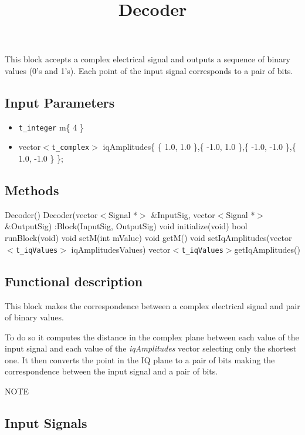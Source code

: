 \documentclass[a4paper]{article}
\title{Decoder}
\begin{document}
\maketitle

This block accepts a complex electrical signal and outputs a sequence of binary values (0's and 1's). Each point of the input signal corresponds to a pair of bits.

\subsection*{Input Parameters}

\begin{itemize}
	\item\texttt{t\_integer} m\{ 4 \}
	\item vector$<$\texttt{t\_complex}$>$ iqAmplitudes\{ \{ 1.0, 1.0 \},\{ -1.0, 1.0 \},\{ -1.0, -1.0 \},\{ 1.0, -1.0 \} \};
\end{itemize}

\subsection*{Methods}
 
Decoder() {}
\bigbreak
Decoder(vector$<$Signal *$>$ \&InputSig, vector$<$Signal *$>$ \&OutputSig) :Block(InputSig, OutputSig) {}
\bigbreak
void initialize(void)
\bigbreak
bool runBlock(void)
\bigbreak
void setM(int mValue)
\bigbreak
void getM()
\bigbreak
void setIqAmplitudes(vector$<$\texttt{t\_iqValues}$>$ iqAmplitudesValues)
\bigbreak
vector$<$\texttt{t\_iqValues}$>$getIqAmplitudes()

\subsection*{Functional description}

This block makes the correspondence between a complex electrical signal and pair of binary values.

To do so it computes the distance in the complex plane between each value of the input signal and each value of the \textit{iqAmplitudes} vector selecting only the shortest one. It then converts the point in the IQ plane to a pair of bits making the correspondence between the input signal and a pair of bits.

NOTE

\pagebreak

\subsection*{Input Signals}
\end{document}
